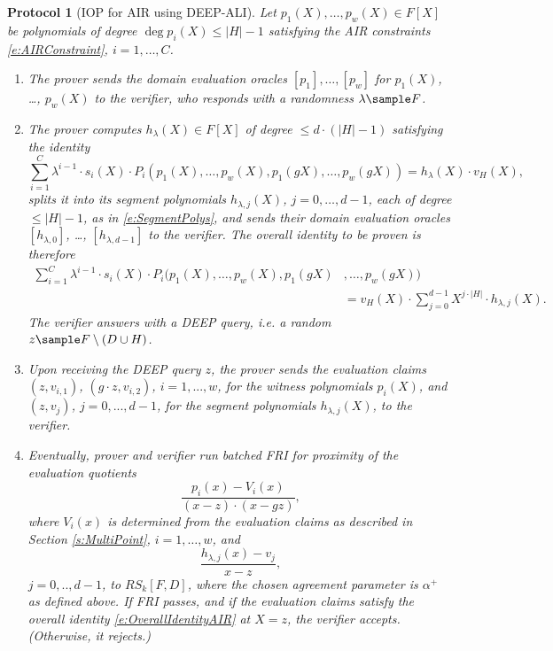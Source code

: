 \documentclass[11pt]{article}
\newtheorem{protocol}[]{Protocol}
\theoremstyle{definition}
\theoremstyle{remark}
\DeclareMathOperator{\Quotient}{\mathsf{Quotient}}
\begin{document}
\begin{protocol}[IOP for AIR using DEEP-ALI]
\label{p:DEEPAIR}
Let $p_1(X), \ldots, p_w(X)\in F[X]$ be polynomials of degree $\deg p_i(X)\leq |H|-1$ satisfying the AIR constraints \eqref{e:AIRConstraint}, $i=1,\ldots, C$.
\begin{enumerate}
\item
The prover sends the domain evaluation oracles  $[p_1], \ldots, [p_w]$ for $p_1(X)$, \ldots, $p_w(X)$ to the verifier, who responds with a randomness $\lambda\sample F$.
%
\item 
The prover computes $h_\lambda(X)\in F[X]$ of degree $\leq d \cdot (|H|-1)$ satisfying the identity
\begin{equation*}
\sum_{i=1}^{C} \lambda^{i-1}\cdot s_i(X)\cdot P_i(p_1(X),\ldots ,p_w(X),p_1(gX), \ldots, p_w(gX)) 
= h_\lambda(X)\cdot v_H(X),
\end{equation*}
splits it into its segment polynomials $h_{\lambda, j}(X)$, $j=0,\ldots, d-1$, each of degree $\leq |H|-1$, as in \eqref{e:SegmentPolys}, and sends their domain evaluation oracles $[h_{\lambda,0}]$, \ldots, $[h_{\lambda,d - 1}]$ to the verifier.  
The overall identity to be proven is therefore
\begin{equation}
\label{e:OverallIdentityAIR}
\begin{aligned}
\sum_{i=1}^{C} \lambda^{i-1}\cdot s_i(X)\cdot P_i(p_1(X), \ldots, p_w(X), p_1(gX)&, \ldots, p_w(gX))
\\ 
&= v_H(X)\cdot \sum_{j=0}^{d-1} X^{j\cdot |H|}\cdot  h_{\lambda,j}(X).
\end{aligned}
\end{equation}
The verifier answers with a DEEP query, i.e. a random $z\sample F\setminus (D\cup H)$.
%
\item 
Upon receiving the DEEP query $z$, the prover sends the evaluation claims $(z,v_{i,1})$, $(g\cdot z, v_{i,2})$, $i=1,...,w$, for the witness polynomials $p_i(X)$, and $(z,v_j)$, $j=0,...,d-1$, for the segment polynomials $h_{\lambda, j}(X)$, to the verifier.
\item
Eventually, prover and verifier run batched FRI for proximity of the evaluation quotients
\begin{equation*}
\frac{p_ i(x)- V_i(x)}{(x-z)\cdot (x-gz)},
\end{equation*}
where $V_i(x)$ is determined from the evaluation claims as described in Section \ref{s:MultiPoint},
 $i=1,\ldots,w$, and
\begin{equation*}
\frac{h_{\lambda,j}(x)-v_j}{x-z}, 
\end{equation*}
$j=0,..,d-1$, to $RS_k[F,D]$, where the chosen agreement parameter is $\alpha^+$ as defined above. 
If FRI passes, and if the evaluation claims satisfy the overall identity \eqref{e:OverallIdentityAIR} at $X=z$, the verifier accepts. 
(Otherwise, it rejects.)
\end{enumerate}
\end{protocol}
\end{document}
